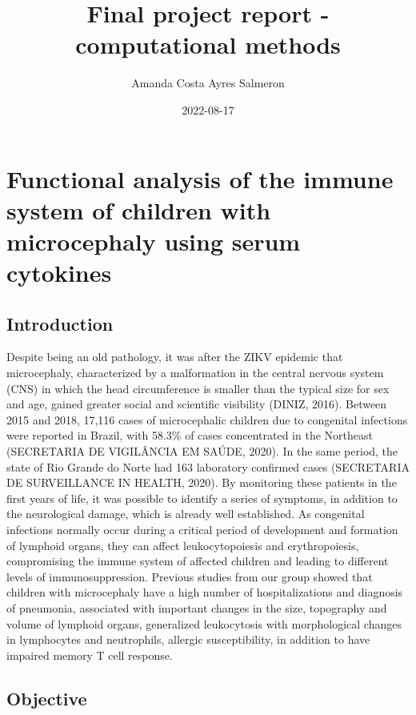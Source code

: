 \documentclass[
]{article}
\title{Final project report - computational methods}
\author{Amanda Costa Ayres Salmeron}
\date{2022-08-17}
\begin{document}
\maketitle

\hypertarget{functional-analysis-of-the-immune-system-of-children-with-microcephaly-using-serum-cytokines}{%
\section{Functional analysis of the immune system of children with
microcephaly using serum
cytokines}\label{functional-analysis-of-the-immune-system-of-children-with-microcephaly-using-serum-cytokines}}

\hypertarget{introduction}{%
\subsection{Introduction}\label{introduction}}

Despite being an old pathology, it was after the ZIKV epidemic that
microcephaly, characterized by a malformation in the central nervous
system (CNS) in which the head circumference is smaller than the typical
size for sex and age, gained greater social and scientific visibility
(DINIZ, 2016). Between 2015 and 2018, 17,116 cases of microcephalic
children due to congenital infections were reported in Brazil, with
58.3\% of cases concentrated in the Northeast (SECRETARIA DE VIGILÂNCIA
EM SAÚDE, 2020). In the same period, the state of Rio Grande do Norte
had 163 laboratory confirmed cases (SECRETARIA DE SURVEILLANCE IN
HEALTH, 2020). By monitoring these patients in the first years of life,
it was possible to identify a series of symptoms, in addition to the
neurological damage, which is already well established. As congenital
infections normally occur during a critical period of development and
formation of lymphoid organs, they can affect leukocytopoiesis and
erythropoiesis, compromising the immune system of affected children and
leading to different levels of immunosuppression. Previous studies from
our group showed that children with microcephaly have a high number of
hospitalizations and diagnosis of pneumonia, associated with important
changes in the size, topography and volume of lymphoid organs,
generalized leukocytosis with morphological changes in lymphocytes and
neutrophils, allergic susceptibility, in addition to have impaired
memory T cell response.

\hypertarget{objective}{%
\subsection{Objective}\label{objective}}
\end{document}
